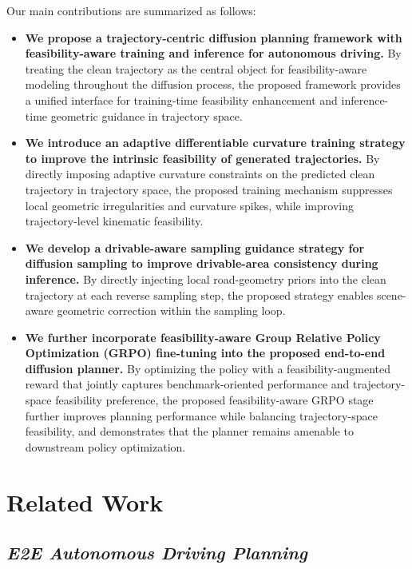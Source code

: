 \documentclass[3p,times,authoryear]{elsarticle}
\begin{document}
Our main contributions are summarized as follows:
\begin{itemize}[leftmargin=1.4em]
    \item \textbf{We propose a trajectory-centric diffusion planning framework with feasibility-aware training and inference for autonomous driving.} By treating the clean trajectory as the central object for feasibility-aware modeling throughout the diffusion process, the proposed framework provides a unified interface for training-time feasibility enhancement and inference-time geometric guidance in trajectory space.
     \item \textbf{We introduce an adaptive differentiable curvature training strategy to improve the intrinsic feasibility of generated trajectories.} By directly imposing adaptive curvature constraints on the predicted clean trajectory in trajectory space, the proposed training mechanism suppresses local geometric irregularities and curvature spikes, while improving trajectory-level kinematic feasibility.
    \item \textbf{We develop a drivable-aware sampling guidance strategy for diffusion sampling  to improve drivable-area consistency during inference.} By directly injecting local road-geometry priors into the clean trajectory at each reverse sampling step, the proposed strategy enables scene-aware geometric correction within the sampling loop.
    \item \textbf{We further incorporate feasibility-aware Group Relative Policy Optimization (GRPO) fine-tuning \citep{shao2024deepseekmath,guo2025deepseekr1} into the proposed end-to-end diffusion planner.} By optimizing the policy with a feasibility-augmented reward that jointly captures benchmark-oriented performance and trajectory-space feasibility preference, the proposed feasibility-aware GRPO stage further improves planning performance while balancing trajectory-space feasibility, and demonstrates that the planner remains amenable to downstream policy optimization.
    
\end{itemize}

\section{Related Work}

\subsection{\textit{E2E Autonomous Driving Planning}}
\end{document}
